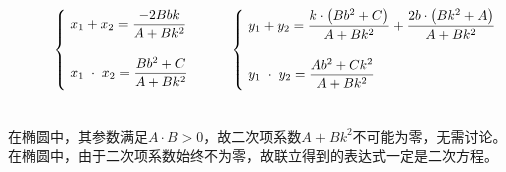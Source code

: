 \documentclass[UTF8]{ctexart}
\begin{document}
    \begin{large}
        \begin{equation*}
            ~~~~~~~~~~\begin{cases}
                ~x_1+x_2=\dfrac{-2Bbk}{A+Bk^2}\\[6mm]
                ~x_1\hspace{3.0pt}\cdot\hspace{3.0pt}x_2=\dfrac{Bb^2+C}{A+Bk^2}\\[2mm]
            \end{cases}~~~~~~
            \begin{cases}
                ~y_1+y_2=\dfrac{k\cdot\left(Bb^2+C\right)}{A+Bk^2}+\dfrac{2b\cdot\left(Bk^2+A\right)}{A+Bk^2}\\[6mm]
                ~y_1\hspace{3.0pt}\cdot\hspace{3.0pt}y_2=\dfrac{Ab^2+Ck^2}{A+Bk^2}\\[2mm]
            \end{cases}
        \end{equation*}
    \end{large}\\[3mm]
    在椭圆中，其参数满足$A\cdot B>0$，故二次项系数$A+Bk^2$不可能为零，无需讨论。\\[3mm]
    在椭圆中，由于二次项系数始终不为零，故联立得到的表达式一定是二次方程。
    
\newpage
\end{document}
